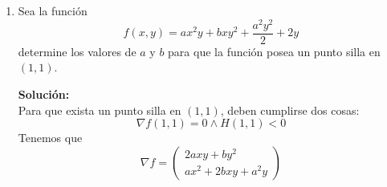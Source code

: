 \documentclass[12pt]{article}
\newenvironment{solucion}
{\begin{mdframed}[backgroundcolor=black!10]
		{\bf Solución:}\\
	}
	{
	\end{mdframed}
}
\newenvironment{preguntas}
{\begin{enumerate}\itemsep12pt
	}
	{
	\end{enumerate}
}
\newcommand{\ra}{\rightarrow}
\begin{document}
\begin{preguntas}
\begin{solucion}
Tenemos que
$$f(x,y)=x^3+3xy^2-15x-12y$$
Luego,
$$\nabla f = \begin{pmatrix} 3x^2 + 3y^2 - 15 \\ 6xy - 12 \end{pmatrix} = \vec{0}$$
Luego, tenemos que resolver
$$3x^2 + 3y^2 - 15 = 0$$
$$6xy - 12 = 0$$
Simplificando,
$$x^2 + y^2 = 5$$
$$xy = 2$$
Sumando dos veces la segunda a la primera ecuación, obtenemos
$$x^2 + 2xy + y^2 = 9$$
Luego,
$$(x+y)^2 = 9 \ra x + y = \pm3$$
Ahora, debemos ver cada uno de estos casos y despejar reemplazando en la otra ecuación.
En primer lugar, veamos el caso donde $x+y = 3$, es decir, $y = 3 - x$.\\
\\
Reemplazando,
$$x(3-x) = 2 \ra x^2-3x+2=0 \ra (x-1)(x-2) = 0$$
De aqui tenemos que $x_1 = 1\ra y_1 = 2$ y $x_2 = 2 \ra y_2 = 1$, por lo que $P_1(1,2)$ y $P_2(2,1)$.\\
\\
Veamos ahora que pasa con $x+y = -3$, es decir $y = -3-x$\\
\\
Reemplazando,
$$x(-3-x) = 2 \ra x^2+3x+2=0 \ra (x+1)(x+2) = 0$$
De aqui tenemos que $x_3 = -1 \ra y_3 = -2$ y $x_4 = -2 \ra y_4 = -1$, por lo que $P_3(-1,-2)$ y $P_4(-2,-1)$.\\
\\
Entonces, los puntos críticos son
$$P_1(1,2), \quad P_2(2,1), \quad P_3(-1,-2), \quad P_4(-2,-1)$$
Calculemos ahora el determinante del Hessiano, es decir,
$$H(x,y) = f_{xx}f_{yy} - f_{xy}^2$$
Notemos que
$$f_{xx} = 6x, \quad f_{yy} = 6x,\quad f_{xy} = 6y$$
Luego,
$$H(x,y) = 36(x^2-y^2)$$
Finalmente,
$$H(P_1) = H(1,2) = 36(1^2-2^2) < 0 \ra \text{Punto silla}$$
$$H(P_2) = H(2,1) = 36(2^2-1^2) > 0$$
$$f_{xx}(2,1) = 12 > 0 \ra \text{Mínimo local}$$
$$H(P_3) = H(-1,-2) = 36((-1)^2-(-2)^2) < 0 \ra \text{Punto silla}$$
$$H(P_4) = H(-2,-1) = 36((-2)^2-(-1)^2) > 0$$
$$f_{xx}(2,1) = -12 < 0 \ra \text{Máximo local}$$
\end{solucion}
\item Sea la función
	$$f(x,y)=ax^2y+bxy^2+\dfrac{a^2y^2}{2}+2y$$
	determine los valores de $a$ y $b$ para que la función posea un punto silla en $(1,1)$.
\begin{solucion}
Para que exista un punto silla en $(1,1)$, deben cumplirse dos cosas:
$$\nabla f(1,1) = 0 \wedge H(1,1) < 0$$
Tenemos que
$$\nabla f = \begin{pmatrix} 2axy + by^2 \\ ax^2 + 2bxy + a^2y\end{pmatrix}$$

\end{solucion}
\end{preguntas}
\end{document}
